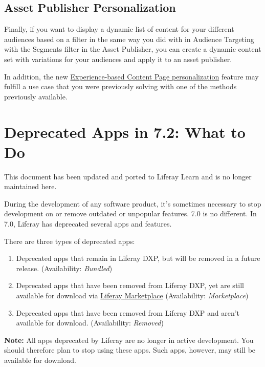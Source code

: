 \section{Asset Publisher
Personalization}\label{asset-publisher-personalization}

Finally, if you want to display a dynamic list of content for your
different audiences based on a filter in the same way you did with in
Audience Targeting with the Segments filter in the Asset Publisher, you
can create a dynamic content set with variations for your audiences and
apply it to an asset publisher.

In addition, the new
\href{/docs/7-2/user/-/knowledge_base/u/content-page-personalization}{Experience-based
Content Page personalization} feature may fulfill a use case that you
were previously solving with one of the methods previously available.

\chapter{Deprecated Apps in 7.2: What to
Do}\label{deprecated-apps-in-7.2-what-to-do}

{This document has been updated and ported to Liferay Learn and is no
longer maintained here.}

During the development of any software product, it's sometimes necessary
to stop development on or remove outdated or unpopular features. 7.0 is
no different. In 7.0, Liferay has deprecated several apps and features.

There are three types of deprecated apps:

\begin{enumerate}
\def\labelenumi{\arabic{enumi}.}
\item
  Deprecated apps that remain in Liferay DXP, but will be removed in a
  future release. (Availability: \emph{Bundled})
\item
  Deprecated apps that have been removed from Liferay DXP, yet are still
  available for download via
  \href{https://web.liferay.com/marketplace}{Liferay Marketplace}
  (Availability: \emph{Marketplace})
\item
  Deprecated apps that have been removed from Liferay DXP and aren't
  available for download. (Availability: \emph{Removed})
\end{enumerate}

\noindent\hrulefill

\textbf{Note:} All apps deprecated by Liferay are no longer in active
development. You should therefore plan to stop using these apps. Such
apps, however, may still be available for download.

